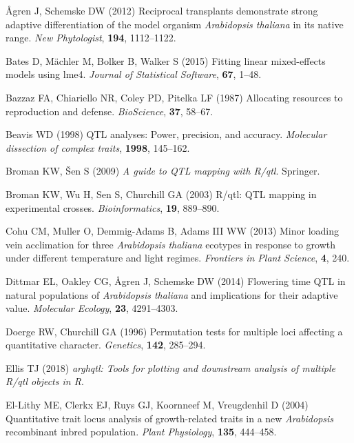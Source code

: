 \documentclass[12pt,]{article}
\begin{document}
\leavevmode\hypertarget{ref-agren_reciprocal_2012}{}%
Ågren J, Schemske DW (2012) Reciprocal transplants demonstrate strong adaptive differentiation of the model organism \emph{Arabidopsis thaliana} in its native range. \emph{New Phytologist}, \textbf{194}, 1112--1122.

\leavevmode\hypertarget{ref-bates2015}{}%
Bates D, Mächler M, Bolker B, Walker S (2015) Fitting linear mixed-effects models using lme4. \emph{Journal of Statistical Software}, \textbf{67}, 1--48.

\leavevmode\hypertarget{ref-Bazzaz1987}{}%
Bazzaz FA, Chiariello NR, Coley PD, Pitelka LF (1987) Allocating resources to reproduction and defense. \emph{BioScience}, \textbf{37}, 58--67.

\leavevmode\hypertarget{ref-beavis1998qtl}{}%
Beavis WD (1998) QTL analyses: Power, precision, and accuracy. \emph{Molecular dissection of complex traits}, \textbf{1998}, 145--162.

\leavevmode\hypertarget{ref-Broman2009}{}%
Broman KW, Šen S (2009) \emph{A guide to QTL mapping with R/qtl}. Springer.

\leavevmode\hypertarget{ref-Broman2003}{}%
Broman KW, Wu H, Sen S, Churchill GA (2003) R/qtl: QTL mapping in experimental crosses. \emph{Bioinformatics}, \textbf{19}, 889--890.

\leavevmode\hypertarget{ref-cohu2013minor}{}%
Cohu CM, Muller O, Demmig-Adams B, Adams III WW (2013) Minor loading vein acclimation for three \emph{Arabidopsis thaliana} ecotypes in response to growth under different temperature and light regimes. \emph{Frontiers in Plant Science}, \textbf{4}, 240.

\leavevmode\hypertarget{ref-dittmar2014flowering}{}%
Dittmar EL, Oakley CG, Ågren J, Schemske DW (2014) Flowering time QTL in natural populations of \emph{Arabidopsis thaliana} and implications for their adaptive value. \emph{Molecular Ecology}, \textbf{23}, 4291--4303.

\leavevmode\hypertarget{ref-doerge1996permutation}{}%
Doerge RW, Churchill GA (1996) Permutation tests for multiple loci affecting a quantitative character. \emph{Genetics}, \textbf{142}, 285--294.

\leavevmode\hypertarget{ref-ellis_arghqtl}{}%
Ellis TJ (2018) \emph{\textup{arghqtl}: Tools for plotting and downstream analysis of multiple R/qtl objects in R}.

\leavevmode\hypertarget{ref-el2004quantitative}{}%
El-Lithy ME, Clerkx EJ, Ruys GJ, Koornneef M, Vreugdenhil D (2004) Quantitative trait locus analysis of growth-related traits in a new \emph{Arabidopsis} recombinant inbred population. \emph{Plant Physiology}, \textbf{135}, 444--458.
\end{document}
